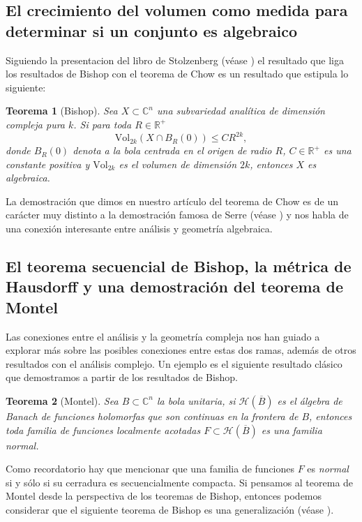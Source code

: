 \documentclass{article}
\newtheorem{teorema}{Teorema}[section]
\newcommand{\con}{\ensuremath{\mathbb{C}^n}}
\newcommand{\re}{\ensuremath{\mathbb R }}
\begin{document}
\subsection{El crecimiento del volumen como medida para determinar si un conjunto es algebraico}
\noindent Siguiendo la presentacion del libro de Stolzenberg (v\'ease \cite{Stolzenberg}) el resultado que liga 
los resultados de Bishop con el teorema de Chow es un resultado que estipula lo siguiente:
\begin{teorema}[Bishop]\label{Bishop1}
        Sea $X\subset\con$ una subvariedad anal\'itica de dimensi\'on compleja pura $k$. Si para toda $R\in\re^+$
        $$\textrm{Vol}_{2k}(X\cap B_R(0))\leq CR^{2k},$$
        donde $B_R(0)$ denota a la bola centrada en el origen de radio $R$, $C\in\re^{+}$ es una constante positiva
        y $\textrm{Vol}_{2k}$ es el volumen de dimensi\'on $2k$, entonces $X$ es algebraica.
\end{teorema}
\noindent La demostraci\'on que dimos en nuestro art\'iculo del teorema de Chow es de un car\'acter muy distinto a la demostraci\'on
famosa de Serre (v\'ease \cite{GAGA}) y nos habla de una conexi\'on interesante entre an\'alisis y geometr\'ia algebraica.

\subsection{El teorema secuencial de Bishop, la m\'etrica de Hausdorff y una demostraci\'on del teorema de Montel}
\noindent Las conexiones entre el an\'alisis y la geometr\'ia compleja nos han guiado a explorar m\'as sobre las posibles conexiones entre estas dos ramas,
adem\'as de otros resultados con el an\'alisis complejo. Un ejemplo es el siguiente resultado cl\'asico que demostramos
a partir de los resultados de Bishop. 
\begin{teorema}[Montel]\label{Montel}
        Sea $B\subset\con$ la bola unitaria, si $\mathcal{H}(\overline{B})$ es el \'algebra de Banach de funciones holomorfas que son continuas 
        en la frontera de $B$, entonces toda familia de funciones localmente acotadas $F\subset\mathcal{H}(\overline{B})$ es una familia \textit{normal}.
\end{teorema}
Como recordatorio hay que mencionar que una familia de funciones $F$ es \textit{normal} si y s\'olo si su cerradura es secuencialmente compacta.
Si pensamos al teorema de Montel desde la perspectiva de los teoremas de Bishop, entonces podemos considerar que el siguiente teorema de Bishop es una
generalizaci\'on (v\'ease \cite[p. 30]{Stolzenberg}).
\end{document}
